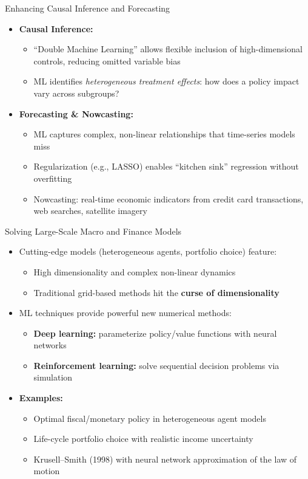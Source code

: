 \documentclass[10pt,english,aspectratio=169]{beamer}
\begin{document}
\begin{frame}{Enhancing Causal Inference and Forecasting}
\begin{itemize}
\item \textbf{Causal Inference:}
\begin{itemize}
\item ``Double Machine Learning'' allows flexible inclusion of high-dimensional controls, reducing omitted variable bias
\item ML identifies \emph{heterogeneous treatment effects}: how does a policy impact vary across subgroups?
\end{itemize}

\medskip
\item \textbf{Forecasting \& Nowcasting:}
\begin{itemize}
\item ML captures complex, non-linear relationships that time-series models miss
\item Regularization (e.g., LASSO) enables ``kitchen sink'' regression without overfitting
\item Nowcasting: real-time economic indicators from credit card transactions, web searches, satellite imagery
\end{itemize}
\end{itemize}
\end{frame}

\begin{frame}{Solving Large-Scale Macro and Finance Models}
\begin{itemize}
\item Cutting-edge models (heterogeneous agents, portfolio choice) feature:
\begin{itemize}
\item High dimensionality and complex non-linear dynamics
\item Traditional grid-based methods hit the \textbf{curse of dimensionality}
\end{itemize}

\medskip
\item ML techniques provide powerful new numerical methods:
\begin{itemize}
\item \textbf{Deep learning:} parameterize policy/value functions with neural networks
\item \textbf{Reinforcement learning:} solve sequential decision problems via simulation
\end{itemize}

\medskip
\item \textbf{Examples:}
\begin{itemize}
\item Optimal fiscal/monetary policy in heterogeneous agent models
\item Life-cycle portfolio choice with realistic income uncertainty
\item Krusell--Smith (1998) with neural network approximation of the law of motion
\end{itemize}
\end{itemize}
\end{frame}
\end{document}
